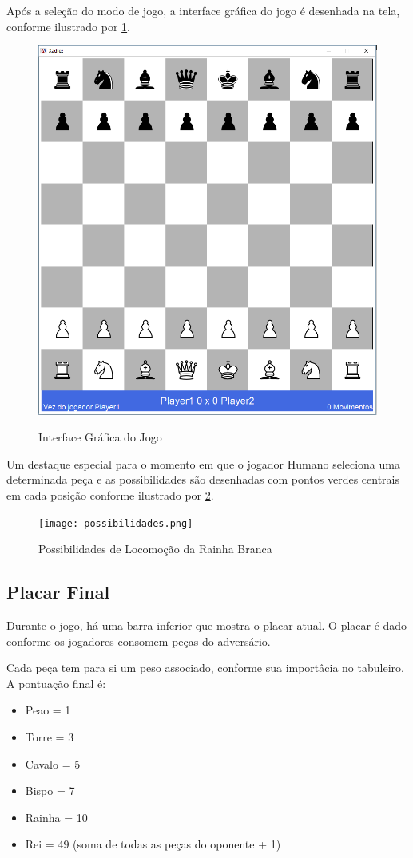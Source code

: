 	 Após a seleção do modo de jogo, a interface gráfica do jogo é desenhada na tela, conforme ilustrado por \ref{lblfig}.
	 \begin{figure}[h]
	 	\centering
	 	\includegraphics[scale = 0.5]{screen.png}
		\label{lblfig}
	 	\caption{Interface Gráfica do Jogo}
	 \end{figure}

	Um destaque especial para o momento em que o jogador Humano seleciona uma determinada peça e as possibilidades
	são desenhadas com pontos verdes centrais em cada posição conforme ilustrado por \ref{fig2}.

	\begin{figure}[h]
		\centering
		\texttt{[image: possibilidades.png]}
		\caption{Possibilidades de Locomoção da Rainha Branca}
		\label{fig2}
	\end{figure}

	\subsection{Placar Final}
	Durante o jogo, há uma barra inferior que mostra o placar atual. O placar é dado conforme os jogadores consomem peças do
	adversário.

	Cada peça tem para si um peso associado, conforme sua importâcia no tabuleiro. A pontuação final é:
	\begin{itemize}
		\item Peao = 1
		\item Torre = 3
		\item Cavalo = 5
		\item Bispo = 7
		\item Rainha  = 10
		\item Rei  = 49 (soma de todas as peças do oponente + 1)
	\end{itemize}

